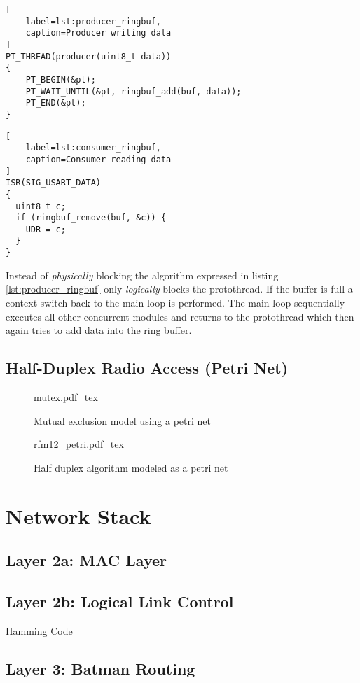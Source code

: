 \begin{lstlisting}[
    label=lst:producer_ringbuf,
    caption=Producer writing data
]
PT_THREAD(producer(uint8_t data))
{
    PT_BEGIN(&pt);
    PT_WAIT_UNTIL(&pt, ringbuf_add(buf, data));
    PT_END(&pt);
}
\end{lstlisting}

\begin{lstlisting}[
    label=lst:consumer_ringbuf,
    caption=Consumer reading data
]
ISR(SIG_USART_DATA)
{
  uint8_t c;
  if (ringbuf_remove(buf, &c)) {
    UDR = c;
  }
}
\end{lstlisting}

Instead of \emph{physically} blocking the algorithm expressed in listing \ref{lst:producer_ringbuf} only \emph{logically} blocks the protothread. If the buffer is full a context-switch back to the main loop is performed. The main loop sequentially executes all other concurrent modules and returns to the protothread which then again tries to add data into the ring buffer.

\section{Half-Duplex Radio Access (Petri Net)}

\begin{figure}[H]
\centering
{mutex.pdf_tex}
\caption[]{Mutual exclusion model using a petri net}
\end{figure}

\begin{figure}[H]
\centering
{rfm12_petri.pdf_tex}
\caption[]{Half duplex algorithm modeled as a petri net}
\end{figure}

\chapter{Network Stack}
\section{Layer 2a: MAC Layer}
\section{Layer 2b: Logical Link Control}
Hamming Code
\section{Layer 3: Batman Routing}
